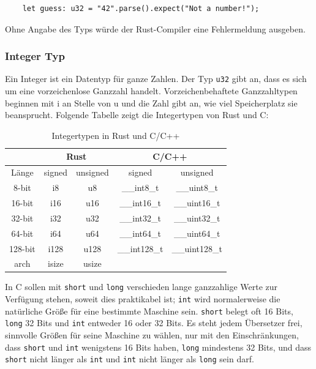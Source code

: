 \begin{lstlisting}
    let guess: u32 = "42".parse().expect("Not a number!");
\end{lstlisting}

Ohne Angabe des Typs würde der Rust-Compiler eine Fehlermeldung ausgeben.

\subsubsection{Integer Typ}

Ein Integer ist ein Datentyp für ganze Zahlen. Der Typ \verb"u32" gibt an, dass es sich um eine vorzeichenlose Ganzzahl handelt. Vorzeichenbehaftete Ganzzahltypen beginnen mit \glqq i\grqq{} an Stelle von \glqq u\grqq{} und die Zahl gibt an, wie viel Speicherplatz sie beansprucht. Folgende Tabelle zeigt die Integertypen von Rust und C:

\begin{table}[htbp]
\centering
\begin{tabular}{|c||c|c||c|c|}
\hline
\rule[-1ex]{0pt}{2.5ex} & \multicolumn{2}{|c||}{Rust} & \multicolumn{2}{|c|}{C/C++} \\
\hline
\rule[-1ex]{0pt}{2.5ex} Länge & signed & unsigned & signed & unsigned \\
\hline
\rule[-1ex]{0pt}{2.5ex} 8-bit & i8 & u8 & \_\_int8\_t & \_\_uint8\_t \\
\hline
\rule[-1ex]{0pt}{2.5ex} 16-bit & i16 & u16 & \_\_int16\_t & \_\_uint16\_t \\
\hline
\rule[-1ex]{0pt}{2.5ex} 32-bit & i32 & u32 & \_\_int32\_t & \_\_uint32\_t \\
\hline
\rule[-1ex]{0pt}{2.5ex} 64-bit & i64 & u64 & \_\_int64\_t & \_\_uint64\_t \\
\hline
\rule[-1ex]{0pt}{2.5ex} 128-bit & i128 & u128 & \_\_int128\_t & \_\_uint128\_t \\
\hline
\rule[-1ex]{0pt}{2.5ex} arch & isize & usize & & \\
\hline
\end{tabular}
\caption{Integertypen in Rust und C/C++}
\end{table}

In C sollen mit \verb"short" und \verb"long" verschieden lange ganzzahlige Werte zur Ver\-fü\-gung stehen, soweit dies praktikabel ist; \verb"int" wird normalerweise die natürliche Größe für eine bestimmte Maschine sein. \verb"short" belegt oft 16 Bits, \verb"long" 32 Bits und \verb"int" entweder 16 oder 32 Bits. Es steht jedem Übersetzer frei, sinnvolle Größen für seine Maschine zu wählen, nur mit den Einschränkungen, dass \verb"short" und \verb"int" wenigstens 16 Bits haben, \verb"long" mindestens 32 Bits, und dass \verb"short" nicht länger als \verb"int" und \verb"int" nicht länger als \verb"long" sein darf. \cite{ProgInC}

